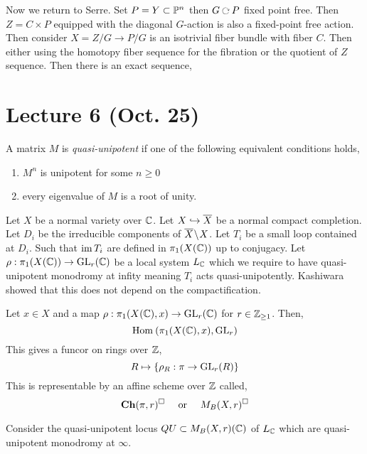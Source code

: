 \documentclass[12pt]{article}
\begin{document}
Now we return to Serre. Set $P = Y \subset \P^n$ then $G \acts P$ fixed point free. Then $Z  = C \times P$ equipped with the diagonal $G$-action is also a fixed-point free action. Then consider $X = Z / G \to P/G$ is an isotrivial fiber bundle with fiber $C$. Then either using the homotopy fiber sequence for the fibration or the quotient of $Z$ sequence. Then there is an exact sequence,
\begin{center}
\end{center}

\section{Lecture 6 (Oct. 25)}

\begin{defn}
A matrix $M$ is \textit{quasi-unipotent} if one of the following equivalent conditions holds,
\begin{enumerate}
\item $M^n$ is unipotent for some $n \ge 0$
\item every eigenvalue of $M$ is a root of unity.
\end{enumerate}
\end{defn}

Let $X$ be a normal variety over $\CC$. Let $X \embed \overline{X}$ be a normal compact completion. Let $D_i$ be the irreducible components of $\overline{X} \sm X$. Let $T_i$ be a small loop contained at $D_i$. Such that $\im{T_i}$ are defined in $\pi_1(X(\CC))$ up to conjugacy. Let $\rho : \pi_1(X(\CC)) \to \GL_r(\CC)$ be a local system $L_{\CC}$ which we require to have quasi-unipotent monodromy at infity meaning $T_i$ acts quasi-unipotently. Kashiwara showed that this does not depend on the compactification.

\begin{defn}
Let $x \in X$ and a map $\rho : \pi_1(X(\CC), x) \to \GL_r(\CC)$ for $r \in \Z_{\ge 1}$. Then,
\[ \Hom{}{\pi_1(X(\CC), x)}{\GL_r} \]
This gives a funcor on rings over $\ZZ$,
\[ R \mapsto \{ \rho_{R} : \pi \to \GL_r(R) \} \]
This is representable by an affine scheme over $\ZZ$ called,
\[ \Ch(\pi, r)^{\square} \quad \text{ or } \quad M_B(X, r)^{\square} \]
\end{defn}

\begin{defn}
Consider the quasi-unipotent locus $QU \subset M_B(X, r)(\CC)$ of $L_{\CC}$ which are quasi-unipotent monodromy at $\infty$.
\end{defn}
\end{document}
